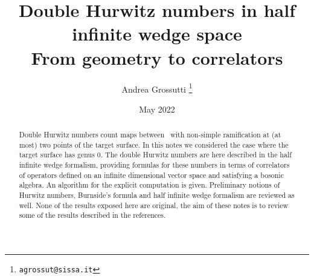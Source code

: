 \documentclass[a4paper,11pt,twoside,openright,leqno]{article}
\title{Double Hurwitz numbers in half infinite wedge space \\{\Large From geometry to correlators}}
\author{Andrea Grossutti%
	\thanks{\texttt{agrossut@sissa.it}}}
\affil{SISSA}
\date{May 2022}
\theoremstyle{definition}
\theoremstyle{remark}
\begin{document}


\maketitle

\begin{abstract}
Double Hurwitz numbers count maps between \rss\ with non-simple ramification at (at most) two points of the target surface. In this notes we considered the case where the target surface has genus 0. The double Hurwitz numbers are here described in the half infinite wedge formalism, providing formulas for these numbers in terms of correlators of operators defined on an infinite dimensional vector space and satisfying a bosonic algebra. An algorithm for the explicit computation is given. Preliminary notions of Hurwitz numbers, Burnside's formula and half infinite wedge formalism are reviewed as well. None of the results exposed here are original, the aim of these notes is to review some of the results described in the references. 
\end{abstract}

\thispagestyle{empty}
\tableofcontents



%

\appendix
%

\nocite{*}
\printbibliography[heading=bibintoc]
\end{document}
